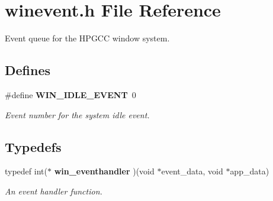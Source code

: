 \section{winevent.h File Reference}
\label{winevent_8h}
Event queue for the HPGCC window system. 

\subsection*{Defines}
\begin{CompactItemize}
\item 
\#define {\bf WIN\_\-IDLE\_\-EVENT}~0
\begin{CompactList}\small\item\em Event number for the system idle event. \item\end{CompactList}\end{CompactItemize}
\subsection*{Typedefs}
\begin{CompactItemize}
\item 
typedef int($\ast$ {\bf win\_\-eventhandler} )(void $\ast$event\_\-data, void $\ast$app\_\-data)
\begin{CompactList}\small\item\em An event handler function. \item\end{CompactList}\end{CompactItemize}
